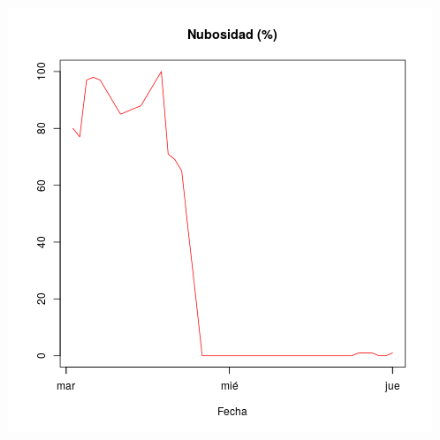 \documentclass{article}
\begin{document}
\begin{figure}[htb]
\begin{center}
   \includegraphics[scale=0.4]{nubosidad.png}
\end{center}
\end{figure}
\end{document}
